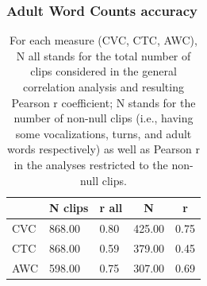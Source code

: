 \documentclass[english,table,man,floatsintext]{apa6}
\begin{document}
\subsubsection{Adult Word Counts
accuracy}\label{adult-word-counts-accuracy}

\begin{table}[tbp]

\begin{center}
\begin{threeparttable}

\caption{\label{tab:tabrs}For each measure (CVC, CTC, AWC), N all stands for the total number of clips considered in the general correlation analysis and resulting Pearson r coefficient; N stands for the number of non-null clips (i.e., having some vocalizations, turns, and adult words respectively) as well as Pearson r in the analyses restricted to the non-null clips. }

\begin{tabular}{lllll}
\toprule
 & \multicolumn{1}{c}{N clips} & \multicolumn{1}{c}{r all} & \multicolumn{1}{c}{N} & \multicolumn{1}{c}{r}\\
\midrule
CVC & 868.00 & 0.80 & 425.00 & 0.75\\
CTC & 868.00 & 0.59 & 379.00 & 0.45\\
AWC & 598.00 & 0.75 & 307.00 & 0.69\\
\bottomrule
\end{tabular}

\end{threeparttable}
\end{center}

\end{table}
\end{document}
